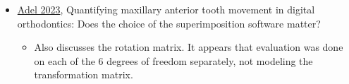 \documentclass[11pt]{article}
\theoremstyle{definition}
\begin{document}
\begin{itemize}
\begin{itemize}
    \end{itemize}
    \item \href{https://www.sciencedirect.com/science/article/pii/S2212443823000656?via%3Dihub}{Adel 2023}, Quantifying maxillary anterior tooth movement in digital orthodontics: Does the choice of the superimposition software matter?
    \begin{itemize}
        \item Also discusses the rotation matrix. It appears that evaluation was done on each of the 6 degrees of freedom separately, not modeling the transformation matrix.
    \end{itemize}
\end{itemize}
\end{document}
